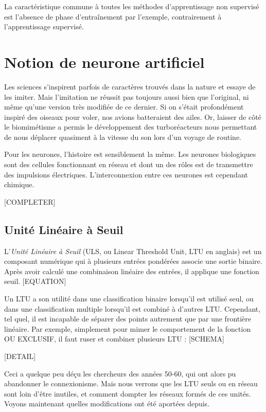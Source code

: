 La caractéristique commune à toutes les méthodes d'apprentissage non supervisé est l'absence de phase d'entraînement par l'exemple, contrairement à l'apprentissage supervisé.


\section{Notion de neurone artificiel}
Les sciences s'inspirent parfois de caractères trouvés dans la nature et essaye de les imiter. Mais l'imitation ne réussit pas toujours aussi bien que l'original, ni même qu'une version très modifiée de ce dernier. Si on s'était profondément inspiré des oiseaux pour voler, nos avions batteraient des ailes. Or, laisser de côté le biomimétisme a permis le développement des turboréacteurs nous permettant de nous déplacer quasiment à la vitesse du son lors d'un voyage de routine.

Pour les neurones, l'histoire est sensiblement la même. Les neurones biologiques sont des cellules fonctionnant en réseau et dont un des rôles est de transmettre des impulsions électriques. L'interconnexion entre ces neurones est cependant chimique.

[COMPLETER]

\subsection{Unité Linéaire à Seuil}

L'\emph{Unité Linéaire à Seuil} (ULS, ou Linear Threshold Unit, LTU en anglais) est un composant numérique qui à plusieurs entrées pondérées associe une sortie binaire. Après avoir calculé une combinaison linéaire des entrées, il applique une fonction seuil. [EQUATION]

Un LTU a son utilité dans une classification binaire lorsqu'il est utilisé seul, ou dans une classification multiple lorsqu'il est combiné à d'autres LTU. Cependant, tel quel, il est incapable de séparer des points autrement que par une frontière linéaire. Par exemple, simplement pour mimer le comportement de la fonction OU EXCLUSIF, il faut ruser et combiner plusieurs LTU : [SCHEMA]

[DETAIL]

Ceci a quelque peu déçu les chercheurs des années 50-60, qui ont alors pu abandonner le connexionisme. Mais nous verrons que les LTU seuls ou en réseau sont loin d'être inutiles, et comment dompter les réseaux formés de ces unités. Voyons maintenant quelles modifications ont été aportées depuis.


